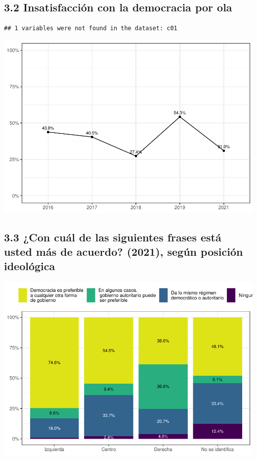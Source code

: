 \documentclass[
  12pt,
]{book}
\begin{document}
\hypertarget{insatisfacciuxf3n-con-la-democracia-por-ola}{%
\subsection{3.2 Insatisfacción con la democracia por ola}\label{insatisfacciuxf3n-con-la-democracia-por-ola}}

\begin{verbatim}
## 1 variables were not found in the dataset: c01
\end{verbatim}

\includegraphics{reporte-elsoc_files/figure-latex/unnamed-chunk-24-1.pdf}

\hypertarget{con-cuuxe1l-de-las-siguientes-frases-estuxe1-usted-muxe1s-de-acuerdo-2021-seguxfan-posiciuxf3n-ideoluxf3gica}{%
\subsection{3.3 ¿Con cuál de las siguientes frases está usted más de acuerdo? (2021), según posición ideológica}\label{con-cuuxe1l-de-las-siguientes-frases-estuxe1-usted-muxe1s-de-acuerdo-2021-seguxfan-posiciuxf3n-ideoluxf3gica}}

\includegraphics{reporte-elsoc_files/figure-latex/unnamed-chunk-25-1.pdf}
\end{document}
